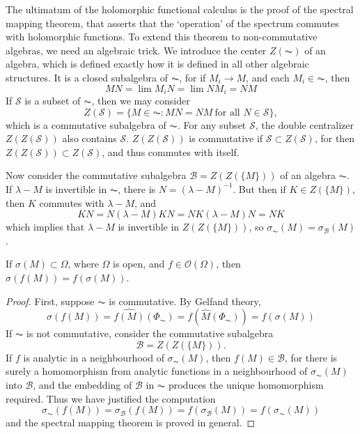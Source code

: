 The ultimatum of the holomorphic functional calculus is the proof of the spectral mapping theorem, that asserts that the `operation' of the spectrum commutes with holomorphic functions. To extend this theorem to non-commutative algebras, we need an algebraic trick. We introduce the center $Z(\AC)$ of an algebra, which is defined exactly how it is defined in all other algebraic structures. It is a closed subalgebra of $\AC$, for if $M_i \to M$, and each $M_i \in \AC$, then
%
\[ MN = \lim M_iN = \lim NM_i = NM \]
%
If $\mathcal{S}$ is a subset of $\AC$, then we may consider
%
\[ Z(\mathcal{S}) = \{ M \in \AC : MN = NM\ \text{for all $N \in \mathcal{S}$} \}, \]
%
which is a commutative subalgebra of $\AC$. For any subset $\mathcal{S}$, the double centralizer $Z(Z(\mathcal{S}))$ also contains $\mathcal{S}$. $Z(Z(\mathcal{S}))$ is commutative if $\mathcal{S} \subset Z(\mathcal{S})$, for then $Z(Z(\mathcal{S})) \subset Z(\mathcal{S})$, and thus commutes with itself.

Now consider the commutative subalgebra $\mathcal{B} = Z(Z(\{ M \}))$ of an algebra $\AC$. If $\lambda - M$ is invertible in $\AC$, there is $N = (\lambda - M)^{-1}$. But then if $K \in Z(\{ M \})$, then $K$ commutes with $\lambda - M$, and
%
\[ KN = N(\lambda - M) K N = NK (\lambda - M) N = NK \]
%
which implies that $\lambda - M$ is invertible in $Z(Z(\{M\}))$, so $\sigma_{\AC}(M) = \sigma_{\mathcal{B}}(M)$.

\begin{theorem}
    If $\sigma(M) \subset \Omega$, where $\Omega$ is open, and $f \in \mathcal{O}(\Omega)$, then $\sigma(f(M)) = f(\sigma(M))$.
\end{theorem}
\begin{proof}
    First, suppose $\AC$ is commutative. By Gelfand theory,
    \[ \sigma(f(M)) = \widehat{f(M)}(\Phi_{\AC}) = f(\widehat{M}(\Phi_{\AC})) = f(\sigma(M)) \]
    If $\AC$ is not commutative, consider the commutative subalgebra
    \[ \mathcal{B} = Z(Z(\{M\})). \]
    If $f$ is analytic in a neighbourhood of $\sigma_{\AC}(M)$, then $f(M) \in \mathcal{B}$, for there is surely a homomorphism from analytic functions in a neighbourhood of $\sigma_{\AC}(M)$ into $\mathcal{B}$, and the embedding of $\mathcal{B}$ in $\AC$ produces the unique homomorphism required. Thus we have justified the computation
    \[ \sigma_{\AC}(f(M)) = \sigma_\mathcal{B}(f(M)) = f(\sigma_\mathcal{B}(M)) = f(\sigma_{\AC}(M)) \]
    and the spectral mapping theorem is proved in general.
\end{proof}

